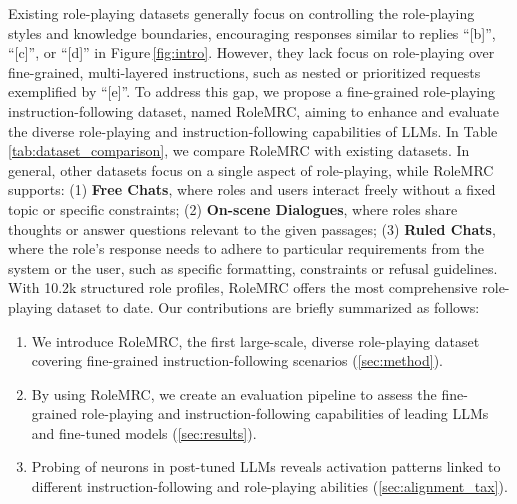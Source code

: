 Existing role-playing datasets generally focus on controlling the role-playing styles and knowledge boundaries, 
encouraging responses similar to replies ``[b]'', ``[c]'', or ``[d]'' in Figure\,\ref{fig:intro}. However, they lack focus on role-playing over fine-grained, multi-layered instructions, such as nested or prioritized requests exemplified %
by ``[e]''. To address this gap, we propose a fine-grained role-playing instruction-following dataset, named RoleMRC, aiming to enhance and evaluate the diverse role-playing and instruction-following capabilities of LLMs. In Table\,\ref{tab:dataset_comparison}, we compare RoleMRC with existing datasets. In general, other datasets focus on a single aspect of role-playing, while RoleMRC supports: (1) \textbf{Free Chats}, where roles and users interact freely without a fixed topic or specific constraints; (2) \textbf{On-scene Dialogues}, where roles share thoughts or answer questions relevant to the given passages; (3) \textbf{Ruled Chats}, where the role's response needs to adhere to particular requirements from the system or the user, such as specific formatting, constraints or refusal guidelines. With 10.2k structured role profiles, RoleMRC offers the most comprehensive role-playing dataset to date. Our contributions are briefly summarized as follows:
\begin{enumerate}
[leftmargin=*,noitemsep,topsep=0pt]
    \item We introduce RoleMRC, the first large-scale, diverse role-playing dataset covering fine-grained instruction-following scenarios (\hyperref[sec:method]{\textsection \ref{sec:method}}).
    \item By using RoleMRC, we create an evaluation pipeline to assess the fine-grained role-playing and instruction-following capabilities of leading LLMs and  fine-tuned models (\hyperref[sec:results]{\textsection \ref{sec:results}}).
    \item Probing of neurons in post-tuned LLMs reveals activation patterns linked to different instruction-following and role-playing abilities (\hyperref[sec:alignment_tax]{\textsection \ref{sec:alignment_tax}}).
\end{enumerate}
